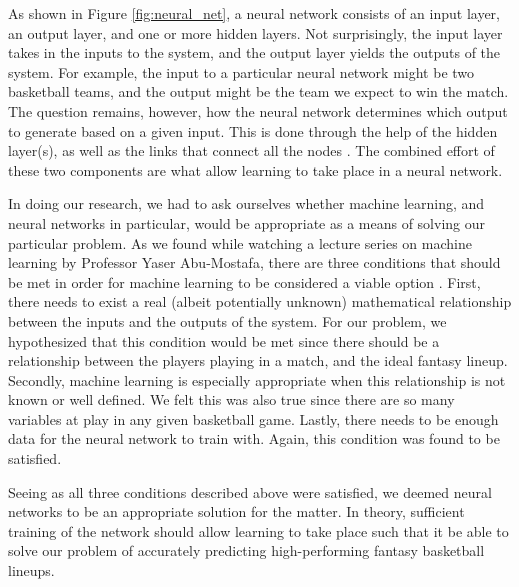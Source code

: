As shown in Figure \ref{fig:neural_net}, a neural network consists of an input layer, an output layer, and one or more hidden layers. Not surprisingly, the input layer takes in the inputs to the system, and the output layer yields the outputs of the system. For example, the input to a particular neural network might be two basketball teams, and the output might be the team we expect to win the match. The question remains, however, how the neural network determines which output to generate based on a given input. This is done through the help of the hidden layer(s), as well as the links that connect all the nodes \cite{neural_net_fundies}. The combined effort of these two components are what allow learning to take place in a neural network.

In doing our research, we had to ask ourselves whether machine learning, and neural networks in particular, would be appropriate as a means of solving our particular problem. As we found while watching a lecture series on machine learning by Professor Yaser Abu-Mostafa, there are three conditions that should be met in order for machine learning to be considered a viable option \cite{caltech}. First, there needs to exist a real  (albeit potentially unknown) mathematical relationship between the inputs and the outputs of the system. For our problem, we hypothesized that this condition would be met since there should be a relationship between the players playing in a match, and the ideal fantasy lineup. Secondly, machine learning is especially appropriate when this relationship is not known or well defined. We felt this was also true since there are so many variables at play in any given basketball game. Lastly, there needs to be enough data for the neural network to train with. Again, this condition was found to be satisfied. 

Seeing as all three conditions described above were satisfied, we deemed neural networks to be an appropriate solution for the matter. In theory, sufficient training of the network should allow learning to take place such that it be able to solve our problem of accurately predicting high-performing fantasy basketball lineups.